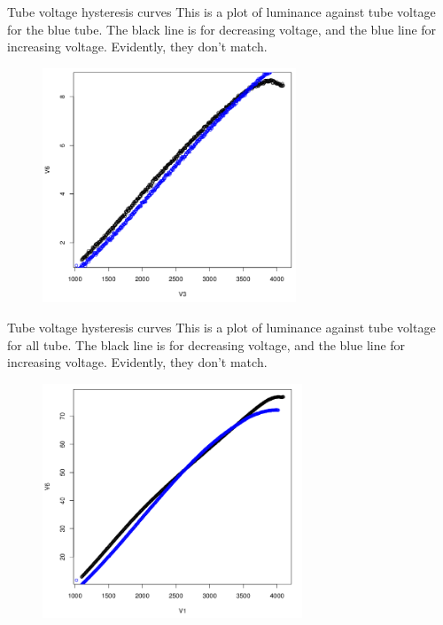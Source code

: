 \documentclass{beamer}
\begin{document}
\begin{frame}[t]{Tube voltage hysteresis curves}
This is a plot of luminance against tube voltage for the blue tube. The black line is for decreasing voltage, and the blue line for increasing voltage. Evidently, they don't match.
\begin{figure}[c]
\includegraphics[height=7cm]{bluehysteresis.png}
\end{figure}
\end{frame}

\begin{frame}[t]{Tube voltage hysteresis curves}
This is a plot of luminance against tube voltage for all tube. The black line is for decreasing voltage, and the blue line for increasing voltage. Evidently, they don't match.
\begin{figure}[c]
\includegraphics[height=7cm]{allhysteresis.png}
\end{figure}
\end{frame}
\end{document}
